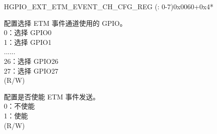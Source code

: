 \begin{register}{H}{GPIO\_EXT\_ETM\_EVENT\_CH\_CFG\_REG (: 0-7)}{0x0060+0x4*}\label{regdesc:GPIOSDETMEVENTCHNCFGREG}
%
%
%
%
\regnewline%
\begin{regdesc}\begin{reglist}
\label{fielddesc:GPIOSDETMCH0EVENTSEL}\item [GPIO\_EXT\_ETM\_CH\regindex{n}\_EVENT\_SEL] 配置选择 ETM 事件通道使用的 GPIO。\\
0：选择 GPIO0\\
1：选择 GPIO1\\
......\\
26：选择 GPIO26\\
27：选择 GPIO27\\ (R/W)
\label{fielddesc:GPIOSDETMCH0EVENTEN}\item [GPIO\_EXT\_ETM\_CH\regindex{n}\_EVENT\_EN] 配置是否使能 ETM 事件发送。\\
0：不使能\\
1：使能\\(R/W)
\end{reglist}\end{regdesc}
\end{register}


